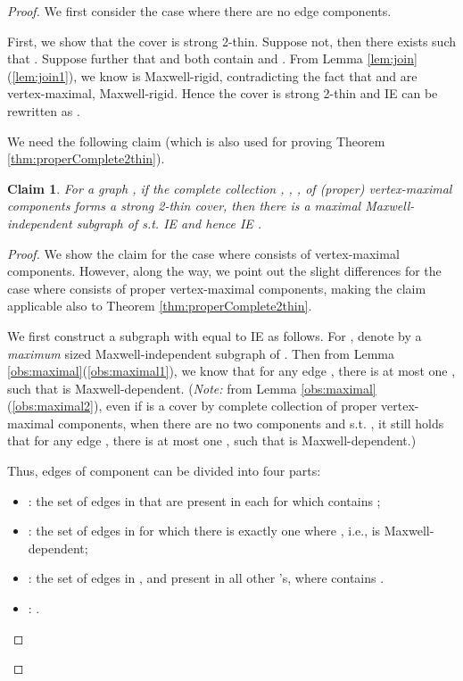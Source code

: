 \documentclass[10pt]{article}
\newtheorem{clm}{Claim}
\begin{document}
\begin{proof}
We first consider the case where there are no edge components.

First, we show that the cover  is strong 2-thin. Suppose not, then there exists  such that . Suppose further that  and  both contain  and . From Lemma \ref{lem:join}(\ref{lem:join1}), we know  is Maxwell-rigid, contradicting the fact that  and  are vertex-maximal, Maxwell-rigid.  Hence the cover  is strong 2-thin and IE can be rewritten as .

We need the following claim (which is also used for proving Theorem \ref{thm:properComplete2thin}).

\medskip
\begin{clm}\label{clm:2thin}
For a graph   , if the complete collection   , , ,  of (proper) vertex-maximal components forms a strong 2-thin cover, then there is a maximal Maxwell-independent subgraph  of  s.t. IE   and hence IE  .
\end{clm}

\begin{proof}
We show the claim for the case where  consists of vertex-maximal components. However, along the way, we point out the slight differences for the case where  consists of proper vertex-maximal components, making the claim applicable also to Theorem \ref{thm:properComplete2thin}.

We first construct a subgraph   with  equal to IE as follows. For , denote by  a {\em maximum} sized Maxwell-independent subgraph of . Then from Lemma \ref{obs:maximal}(\ref{obs:maximal1}), we know that for any edge , there is at most one , such that  is Maxwell-dependent. ({\em Note:} from Lemma \ref{obs:maximal}(\ref{obs:maximal2}), even if  is a cover by complete collection of proper vertex-maximal components, when there are no two components  and  s.t.     , it still holds that for any edge , there is at most one , such that  is Maxwell-dependent.)



\medskip
\noindent Thus, edges of component  can be divided into four parts:
\begin{itemize}
\item : the set of edges  in  that are present in each  for which  contains ;
\item : the set of edges  in  for which there is exactly one  where  , i.e.,  is Maxwell-dependent;
\item : the set of edges  in , and present in all other 's, where  contains .
\item : .
\end{itemize}


\end{proof}
\end{proof}
\end{document}
